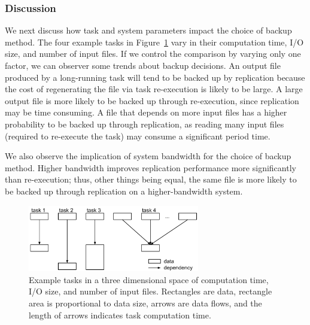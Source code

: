 \documentclass{sig-alternate}
\newcommand{\iannote}[1]{ {\textcolor{red}    { ***Ian:      #1 }}}
\newcommand{\katznote}[1]{ {\textcolor{blue}    { ***Dan:      #1 }}}
\newcommand{\zhaonote}[1]{{\textcolor{cyan}    { ***Zhao:      #1 }}}
\newcommand{\kylenote}[1]{{\textcolor{orange}    { ***Kyle:      #1 }}}
\newcommand{\iannote}[1]{}
\newcommand{\katznote}[1]{}
\newcommand{\zhaonote}[1]{}
\newcommand{\kylenote}[1]{}
\begin{document}
\subsubsection{Discussion}
We next discuss how task and system parameters impact the choice of backup method.
The four example tasks in Figure~\ref{fig:taxonomy} vary in their computation time, I/O size, and number of input files. If we control the comparison by varying only one factor, we can observer some trends about backup decisions.
An output file produced by a long-running task will tend to be backed up by replication because the cost of regenerating the file via task re-execution is likely to be large.
A large output file is more likely to be backed up through re-execution, since replication may be time consuming.
A file that depends on more input files has a higher probability to be backed up through replication, as reading many input files (required to re-execute the task) may consume a significant period time.

We also observe the implication of system bandwidth for the choice of backup method.
Higher bandwidth improves replication performance more significantly than re-execution; thus, other things being equal, the same file is more likely to be backed up through replication on a higher-bandwidth system.

\begin{figure}[ht]
	\begin{center}
		\includegraphics[width=75mm]{pictures/task-taxonomy}
		\caption{Example tasks in a three dimensional space of computation time, I/O size, and number of input files. Rectangles are data, rectangle area is proportional to data size, arrows are data flows, and the length of arrows indicates task computation time.
		\label{fig:taxonomy}}
  	\end{center}
\end{figure}
\end{document}
